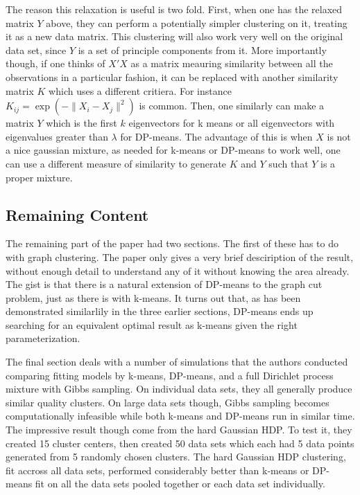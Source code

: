 \documentclass[11pt]{article}
\theoremstyle{definition}
\begin{document}
The reason this relaxation is useful is two fold. First, when one has the relaxed matrix $Y$ above, they can perform a potentially simpler clustering on it, treating it as a new data matrix. This clustering will also work very well on the original data set, since $Y$ is a set of principle components from it. More importantly though, if one thinks of $X'X$ as a matrix meauring similarity between all the observations in a particular fashion, it can be replaced with another similarity matrix $K$ which uses a different critiera. For instance $K_{ij} = \exp\left(-\|X_i-X_j\|^2\right)$ is common. Then, one similarly can make a matrix $Y$ which is the first $k$ eigenvectors for k means or all eigenvectors with eigenvalues greater than $\lambda$ for DP-means. The advantage of this is when $X$ is not a nice gaussian mixture, as needed for k-means or DP-means to work well, one can use a different measure of similarity to generate $K$ and $Y$ such that $Y$ is a proper mixture.

\subsection{Remaining Content}
The remaining part of the paper had two sections. The first of these has to do with graph clustering. The paper only gives a very brief desciription of the result, without enough detail to understand any of it without knowing the area already. The gist is that there is a natural extension of DP-means to the graph cut problem, just as there is with k-means. It turns out that, as has been demonstrated similarlily in the three earlier sections, DP-means ends up searching for an equivalent optimal result as k-means given the right parameterization. \par
The final section deals with a number of simulations that the authors conducted comparing fitting models by k-means, DP-means, and a full Dirichlet process mixture with Gibbs sampling. On individual data sets, they all generally produce similar quality clusters. On large data sets though, Gibbs sampling becomes computationally infeasible while both k-means and DP-means run in similar time. The impressive result though come from the hard Gaussian HDP. To test it, they created 15 cluster centers, then created 50 data sets which each had 5 data points generated from 5 randomly chosen clusters. The hard Gaussian HDP clustering, fit accross all data sets, performed considerably better than k-means or DP-means fit on all the data sets pooled together or each data set individually.
\end{document}
